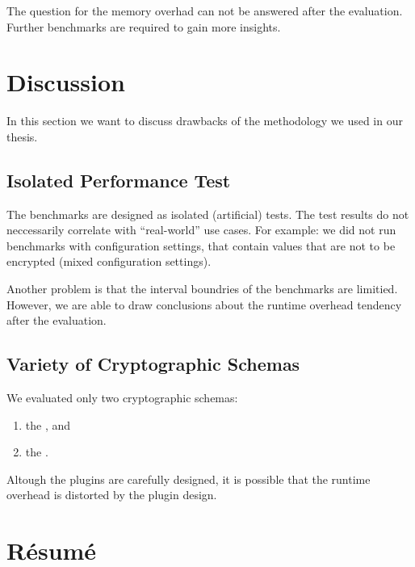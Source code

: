The question for the memory overhad can not be answered after the evaluation.
Further benchmarks are required to gain more insights.

\section{Discussion}

In this section we want to discuss drawbacks of the methodology we used in our thesis.

	\subsection{Isolated Performance Test}

The benchmarks are designed as isolated (artificial) tests.
The test results do not neccessarily correlate with ``real-world'' use cases.
For example: we did not run benchmarks with configuration settings, that contain values that are not to be encrypted (mixed configuration settings).

Another problem is that the interval boundries of the benchmarks are limitied.
However, we are able to draw conclusions about the runtime overhead tendency after the evaluation.

	\subsection{Variety of Cryptographic Schemas}

We evaluated only two cryptographic schemas:
\begin{enumerate}
\item the \crypto, and
\item the \fcrypt.
\end{enumerate}

Altough the plugins are carefully designed, it is possible that the runtime overhead is distorted by the plugin design.

\section{Résumé}

